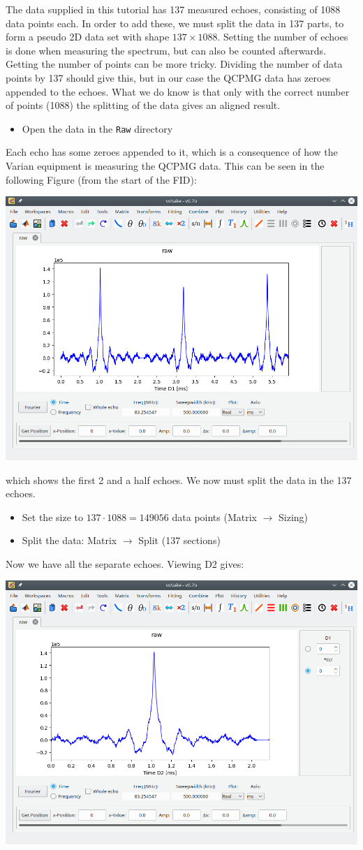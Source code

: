 \documentclass[11pt,a4paper]{article}
\begin{document}
The data supplied in this tutorial has 137 measured echoes, consisting of 1088 data points each. In
order to add these, we must split the data in 137 parts, to form a pseudo 2D data set with shape
$137 \times 1088$. Setting the number of echoes is done when measuring the spectrum, but can also
be counted afterwards. Getting the number of points can be more tricky. Dividing the number of data
points by 137 should give this, but in our case the QCPMG data has zeroes appended to the echoes.
What we do know is that only with the correct number of points (1088) the splitting of the data
gives an aligned result.

\begin{itemize}
  \item Open the data in the \texttt{Raw} directory
\end{itemize}
Each echo has some zeroes appended to it, which is a consequence of how the Varian equipment is
measuring the QCPMG data. This can be seen in the following Figure (from the start of the FID):
\begin{center}
\includegraphics[width=0.7\linewidth]{Figs/Fig1.png}
\end{center}
which shows the first 2 and a half echoes. We now must split the data in the 137 echoes.
\begin{itemize}
  \item Set the size to $137 \cdot 1088 = 149056$ data points (Matrix $\longrightarrow$ Sizing)
  \item Split the data: Matrix $\longrightarrow$ Split (137 sections)
\end{itemize}
Now we have all the separate echoes. Viewing D2 gives:
\begin{center}
\includegraphics[width=0.7\linewidth]{Figs/Fig2.png}
\end{center}
\end{document}
